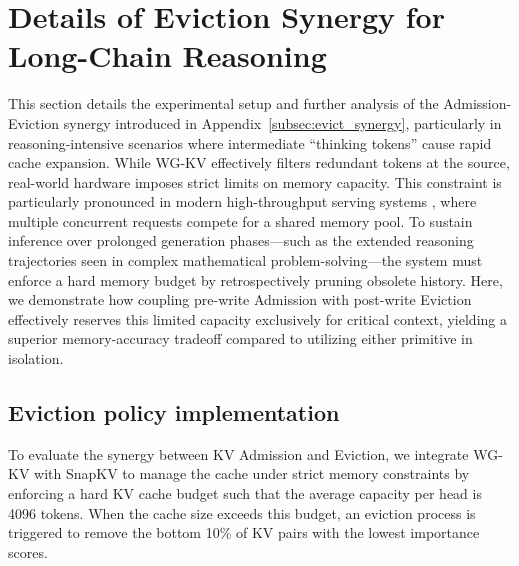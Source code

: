 \section{Details of Eviction Synergy for Long-Chain Reasoning}
\label{app:evict}

This section details the experimental setup and further analysis of the Admission-Eviction synergy introduced in Appendix~\ref{subsec:evict_synergy}, particularly in reasoning-intensive scenarios where intermediate ``thinking tokens'' cause rapid cache expansion. While WG-KV effectively filters redundant tokens at the source, real-world hardware imposes strict limits on memory capacity. This constraint is particularly pronounced in modern high-throughput serving systems \cite{pagedattn,sglang}, where multiple concurrent requests compete for a shared memory pool. To sustain inference over prolonged generation phases---such as the extended reasoning trajectories seen in complex mathematical problem-solving---the system must enforce a hard memory budget by retrospectively pruning obsolete history. Here, we demonstrate how coupling pre-write Admission with post-write Eviction effectively reserves this limited capacity exclusively for critical context, yielding a superior memory-accuracy tradeoff compared to utilizing either primitive in isolation.

\subsection{Eviction policy implementation}

To evaluate the synergy between KV Admission and Eviction, we integrate WG-KV with SnapKV to manage the cache under strict memory constraints by enforcing a hard KV cache budget such that the average capacity per head is 4096 tokens. When the cache size exceeds this budget, an eviction process is triggered to remove the bottom 10\% of KV pairs with the lowest importance scores.

